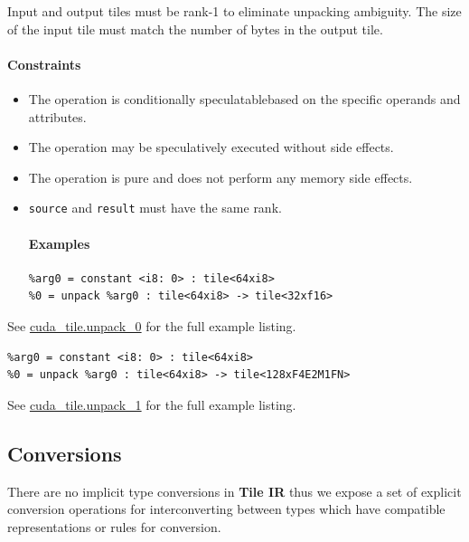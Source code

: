 \documentclass{article}
\begin{document}
Input and output tiles must be rank-1 to eliminate unpacking ambiguity. The size of the input tile must match the number of bytes in the output tile.



\paragraph{Constraints}

\begin{itemize}
\item The operation is conditionally speculatablebased on the specific operands and attributes.
\item The operation may be speculatively executed without side effects.
\item The operation is pure and does not perform any memory side effects.
\item \texttt{source} and \texttt{result} must have the same rank.


\paragraph{Examples}

\begin{lstlisting}
%arg0 = constant <i8: 0> : tile<64xi8>
%0 = unpack %arg0 : tile<64xi8> -> tile<32xf16>
\end{lstlisting}

\end{itemize}
See \href{https://docs.nvidia.com/cuda/tile-ir/latest/sections/appendix.html#example-cuda-tile-unpack-0}{cuda\_tile.unpack\_0} for the full example listing.


\begin{lstlisting}
%arg0 = constant <i8: 0> : tile<64xi8>
%0 = unpack %arg0 : tile<64xi8> -> tile<128xF4E2M1FN>
\end{lstlisting}

See \href{https://docs.nvidia.com/cuda/tile-ir/latest/sections/appendix.html#example-cuda-tile-unpack-1}{cuda\_tile.unpack\_1} for the full example listing.




\subsection{Conversions}

There are no implicit type conversions in \textbf{Tile IR} thus we expose a set of explicit conversion operations for interconverting between types which have compatible representations or rules for conversion.
\end{document}
